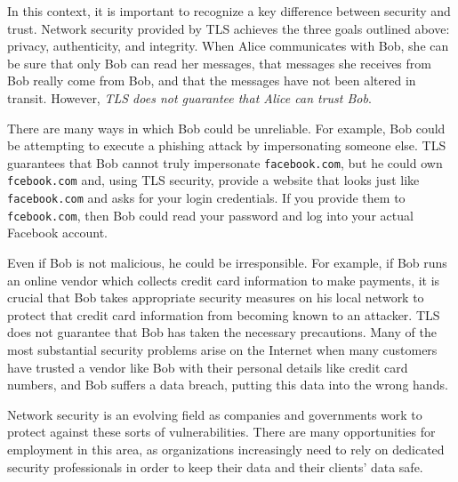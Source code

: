In this context, it is important to recognize a key difference between security and trust. Network security provided by TLS achieves the three goals outlined above: privacy, authenticity, and integrity. When Alice communicates with Bob, she can be sure that only Bob can read her messages, that messages she receives from Bob really come from Bob, and that the messages have not been altered in transit. However, \emph{TLS does not guarantee that Alice can trust Bob}.

There are many ways in which Bob could be unreliable. For example, Bob could be attempting to execute a phishing attack by impersonating someone else. TLS guarantees that Bob cannot truly impersonate \texttt{facebook.com}, but he could own \texttt{fcebook.com} and, using TLS security, provide a website that looks just like \texttt{facebook.com} and asks for your login credentials. If you provide them to \texttt{fcebook.com}, then Bob could read your password and log into your actual Facebook account.

Even if Bob is not malicious, he could be irresponsible. For example, if Bob runs an online vendor which collects credit card information to make payments, it is crucial that Bob takes appropriate security measures on his local network to protect that credit card information from becoming known to an attacker. TLS does not guarantee that Bob has taken the necessary precautions. Many of the most substantial security problems arise on the Internet when many customers have trusted a vendor like Bob with their personal details like credit card numbers, and Bob suffers a data breach, putting this data into the wrong hands.

Network security is an evolving field as companies and governments work to protect against these sorts of vulnerabilities. There are many opportunities for employment in this area, as organizations increasingly need to rely on dedicated security professionals in order to keep their data and their clients' data safe.